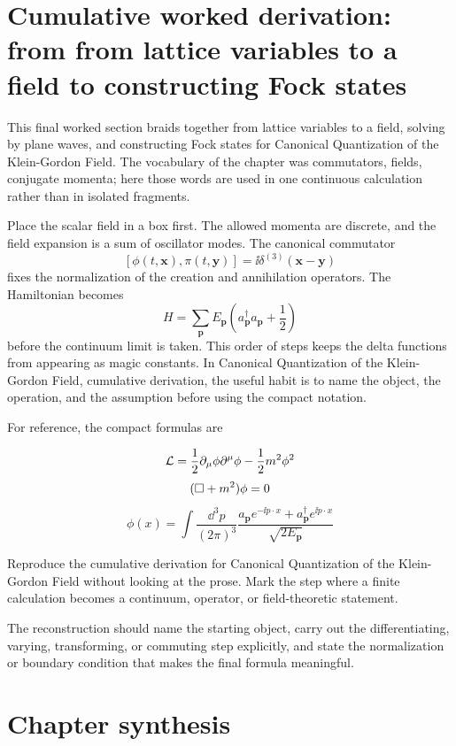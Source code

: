 \section{Cumulative worked derivation: from from lattice variables to a field to constructing Fock states}

This final worked section braids together from lattice variables to a field, solving by plane waves, and constructing Fock states for Canonical Quantization of the Klein-Gordon Field.  The vocabulary of the chapter was commutators, fields, conjugate momenta; here those words are used in one continuous calculation rather than in isolated fragments.

Place the scalar field in a box first.  The allowed momenta are discrete, and the field expansion is a sum of oscillator modes.  The canonical commutator
\[
  [\phi(t,\bm x),\pi(t,\bm y)]=\ii\delta^{(3)}(\bm x-\bm y)
\]
fixes the normalization of the creation and annihilation operators.  The Hamiltonian becomes
\[
  H=\sum_{\bm p}E_{\bm p}\left(a_{\bm p}^\dagger a_{\bm p}+\frac12\right)
\]
before the continuum limit is taken.  This order of steps keeps the delta functions from appearing as magic constants.  In Canonical Quantization of the Klein-Gordon Field, cumulative derivation, the useful habit is to name the object, the operation, and the assumption before using the compact notation.

For reference, the compact formulas are

\[
  \mathcal L=\frac12\partial_\mu\phi\partial^\mu\phi-\frac12m^2\phi^2
\]
\[
  (\Box+m^2)\phi=0
\]
\[
  \phi(x)=\int\frac{\dd^3p}{(2\pi)^3}\frac{a_{\bm p}e^{-\ii p\cdot x}+a_{\bm p}^\dagger e^{\ii p\cdot x}}{\sqrt{2E_{\bm p}}}
\]

\begin{exercise}
Reproduce the cumulative derivation for Canonical Quantization of the Klein-Gordon Field without looking at the prose.  Mark the step where a finite calculation becomes a continuum, operator, or field-theoretic statement.
\begin{answer}
The reconstruction should name the starting object, carry out the differentiating, varying, transforming, or commuting step explicitly, and state the normalization or boundary condition that makes the final formula meaningful.
\end{answer}
\end{exercise}



\section{Chapter synthesis}

